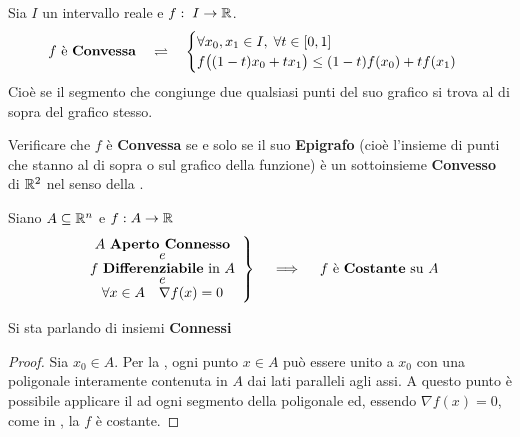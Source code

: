 \begin{definition}
	Sia $I$ un intervallo reale e $f:\; I \to \mathbb{R}$.
	\begin{equation*}
		f \text{ è \textbf{Convessa}}
		\quad \rightleftharpoons \quad
		\begin{cases}
			\forall x_0, x_1 \in I,\; \forall t \in \left[0,1\right]\\
			f \bigl( (1-t)x_0 + t x_1 \bigr) \leq (1-t) f(x_0) + t f(x_1)
		\end{cases}
	\end{equation*}
	Cioè se il segmento che congiunge due qualsiasi punti del suo grafico si trova al di sopra del grafico stesso.
\end{definition}
\begin{exercise}
	Verificare che $f$ è \textbf{Convessa} se e solo se il suo \textbf{Epigrafo} (cioè l'insieme di punti che stanno al di sopra o sul grafico della funzione)
	è un sottoinsieme \textbf{Convesso} di $\mathbb{R}^2$ nel senso della .
\end{exercise}
\begin{proposition}
	Siano $A \subseteq \mathbb{R}^n$ e $f: A \to \mathbb{R}$
	\[
		\left.
			\begin{array}{c}
				A \text{ \textbf{Aperto Connesso}}\\[-1ex]
				e\\[-0.5ex]
				f \text{ \textbf{Differenziabile} in } A\\[-1ex]
				e\\[-0.5ex]
				\forall x \in A \quad \nabla f(x) = 0
			\end{array}
		\right\}
		\quad \implies \quad
		f \text{ è \textbf{Costante} su } A
	\]
	\vspace*{-\baselineskip}
	\begin{note}
		Si sta parlando di insiemi \textbf{Connessi}
	\end{note}
	\begin{proof}
		Sia $x_0 \in A$. Per la , ogni punto $x \in A$ può essere unito a $x_0$ con una poligonale interamente contenuta in $A$ dai lati paralleli agli assi. A questo punto è possibile applicare il  ad ogni segmento della poligonale ed, essendo $\nabla f(x) = 0$, come in , la $f$ è costante.
	\end{proof}
\end{proposition}


